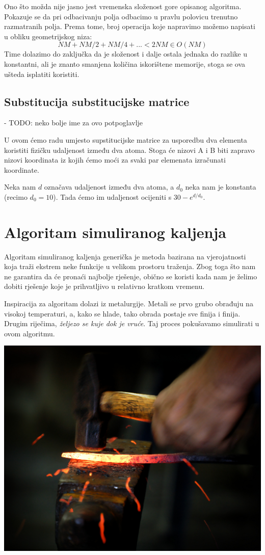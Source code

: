 \documentclass[times, utf8, zavrsni]{fer}
\begin{document}
Ono što možda nije jasno jest vremenska složenost gore opisanog algoritma.
Pokazuje se da pri odbacivanju polja odbacimo u pravlu polovicu trenutno
razmatranih polja. Prema tome, broj operacija koje napravimo možemo napisati
u obliku geometrijskog niza:
$$ NM + NM/2 + NM/4 + ... < 2 NM \in O(NM) $$
Time dolazimo do zaključka da je složenost i dalje ostala jednaka do
razlike u konstantni, ali je znanto smanjena količina iskorištene
memorije, stoga se ova ušteda isplatiti koristiti.




\section{Substitucija substitucijske matrice}
- TODO: neko bolje ime za ovo potpoglavlje

U ovom ćemo radu umjesto supstitucijske matrice za usporedbu dva elementa
koristiti fizičku udaljenost između dva atoma. Stoga će nizovi A i B biti
zapravo nizovi koordinata iz kojih ćemo moći za svaki par elemenata
izračunati koordinate. 

Neka nam $d$ označava udaljenost između dva atoma, a $d_0$ neka nam
je konstanta (recimo $d_0 = 10$). Tada ćemo im udaljenost ocijeniti s
$30-e^{d/d_0}$. 


\chapter{Algoritam simuliranog kaljenja}
Algoritam simuliranog kaljenja generička je metoda bazirana na vjerojatnosti koja
traži ekstrem neke funkcije u velikom prostoru traženja. Zbog toga što nam ne
garantira da će pronaći najbolje rješenje, obično se koristi kada nam je
želimo dobiti rješenje koje je prihvatljivo u relativno kratkom
vremenu.

Inspiracija za algoritam dolazi iz metalurgije. Metali se prvo grubo obrađuju
na visokoj temperaturi, a, kako se hlade, tako obrada postaje sve finija
i  finija. Drugim riječima, \textit{željezo se kuje dok je vruće}. 
Taj proces pokušavamo simulirati u ovom algoritmu.

\includegraphics{res/Kovanje_zeljeza_l.jpg}
\end{document}
